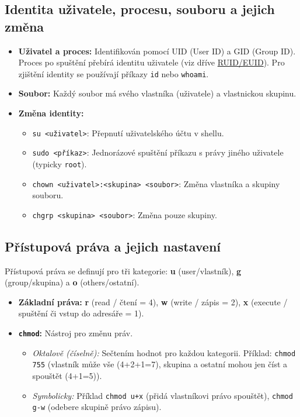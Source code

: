 \subsection{Identita uživatele, procesu, souboru a jejich změna}
\label{sub:identita}
\begin{itemize}
    \item \textbf{Uživatel a proces:} Identifikován pomocí UID (User ID) a GID (Group ID). Proces po spuštění přebírá identitu uživatele (viz dříve \hyperref[sub:UID]{RUID/EUID}). Pro zjištění identity se používají příkazy \texttt{id} nebo \texttt{whoami}.
    \item \textbf{Soubor:} Každý soubor má svého vlastníka (uživatele) a vlastnickou skupinu.
    \item \textbf{Změna identity:}
    \begin{itemize}
        \item \texttt{su <uživatel>}: Přepnutí uživatelského účtu v shellu.
        \item \texttt{sudo <příkaz>}: Jednorázové spuštění příkazu s právy jiného uživatele (typicky \texttt{root}).
        \item \texttt{chown <uživatel>:<skupina> <soubor>}: Změna vlastníka a skupiny souboru.
        \item \texttt{chgrp <skupina> <soubor>}: Změna pouze skupiny.
    \end{itemize}
\end{itemize}

\subsection{Přístupová práva a jejich nastavení}
Přístupová práva se definují pro tři kategorie: \textbf{u} (user/vlastník), \textbf{g} (group/skupina) a \textbf{o} (others/ostatní).
\begin{itemize}
    \item \textbf{Základní práva:} \textbf{r} (read / čtení = 4), \textbf{w} (write / zápis = 2), \textbf{x} (execute / spuštění či vstup do adresáře = 1).
    \item \textbf{\texttt{chmod}:} Nástroj pro změnu práv.
    \begin{itemize}
        \item \textit{Oktalově (číselně):} Sečtením hodnot pro každou kategorii. Příklad: \texttt{chmod 755} (vlastník může vše (4+2+1=7), skupina a ostatní mohou jen číst a spouštět (4+1=5)).
        \item \textit{Symbolicky:} Příklad \texttt{chmod u+x} (přidá vlastníkovi právo spouštět), \texttt{chmod g-w} (odebere skupině právo zápisu).
    \end{itemize}
\end{itemize}

